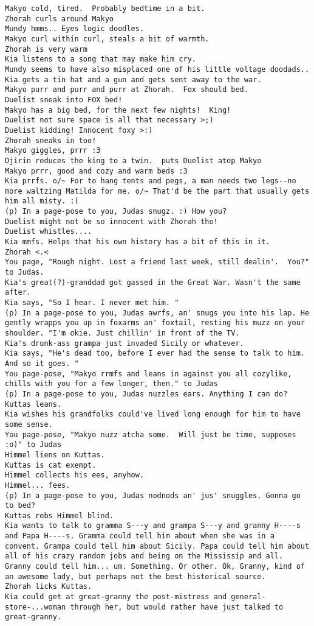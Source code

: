 \begin{verbatim}
Makyo cold, tired.  Probably bedtime in a bit.
Zhorah curls around Makyo
Mundy hmms.. Eyes logic doodles.
Makyo curl within curl, steals a bit of warmth.
Zhorah is very warm
Kia listens to a song that may make him cry.
Mundy seems to have also misplaced one of his little voltage doodads..
Kia gets a tin hat and a gun and gets sent away to the war.
Makyo purr and purr and purr at Zhorah.  Fox should bed.
Duelist sneak into FOX bed!
Makyo has a big bed, for the next few nights!  King!
Duelist not sure space is all that necessary >;)
Duelist kidding! Innocent foxy >:)
Zhorah sneaks in too!
Makyo giggles, prrr :3
Djirin reduces the king to a twin.  puts Duelist atop Makyo
Makyo prrr, good and cozy and warm beds :3
Kia prrfs. o/~ For to hang tents and pegs, a man needs two legs--no more waltzing Matilda for me. o/~ That'd be the part that usually gets him all misty. :(
(p) In a page-pose to you, Judas snugz. :) How you?
Duelist might not be so innocent with Zhorah tho!
Duelist whistles....
Kia mmfs. Helps that his own history has a bit of this in it.
Zhorah <.<
You page, "Rough night. Lost a friend last week, still dealin'.  You?" to Judas.
Kia's great(?)-granddad got gassed in the Great War. Wasn't the same after.
Kia says, "So I hear. I never met him. "
(p) In a page-pose to you, Judas awrfs, an' snugs you into his lap. He gently wrapps you up in foxarms an' foxtail, resting his muzz on your shoulder. "I'm okie. Just chillin' in front of the TV.
Kia's drunk-ass grampa just invaded Sicily or whatever.
Kia says, "He's dead too, before I ever had the sense to talk to him. And so it goes. "
You page-pose, "Makyo rrmfs and leans in against you all cozylike, chills with you for a few longer, then." to Judas
(p) In a page-pose to you, Judas nuzzles ears. Anything I can do?
Kuttas leans.
Kia wishes his grandfolks could've lived long enough for him to have some sense.
You page-pose, "Makyo nuzz atcha some.  Will just be time, supposes :o)" to Judas
Himmel liens on Kuttas.
Kuttas is cat exempt.
Himmel collects his ees, anyhow.
Himmel... fees.
(p) In a page-pose to you, Judas nodnods an' jus' snuggles. Gonna go to bed?
Kuttas robs Himmel blind.
Kia wants to talk to gramma S---y and grampa S---y and granny H----s and Papa H----s. Gramma could tell him about when she was in a convent. Grampa could tell him about Sicily. Papa could tell him about all of his crazy random jobs and being on the Mississip and all. Granny could tell him... um. Something. Or other. Ok, Granny, kind of an awesome lady, but perhaps not the best historical source.
Zhorah licks Kuttas.
Kia could get at great-granny the post-mistress and general-store-...woman through her, but would rather have just talked to great-granny.

\end{verbatim}
